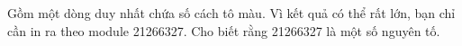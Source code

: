 Gồm một dòng duy nhất chứa số cách tô màu. Vì kết quả có thể rất lớn, bạn chỉ cần in ra theo module 21266327. Cho biết rằng 21266327 là một số nguyên tố.  

\